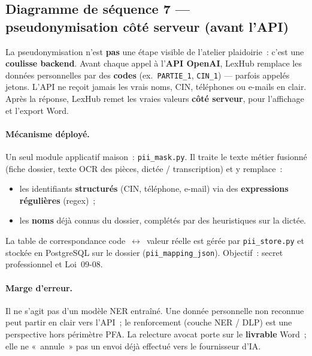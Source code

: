 \subsection{Diagramme de séquence 7 --- pseudonymisation côté serveur (avant l'API)}
\label{sec:seq-pii}

La pseudonymisation n'est \textbf{pas} une étape visible de l'atelier plaidoirie~: c'est une \textbf{coulisse backend}. Avant chaque appel à l'\textbf{API OpenAI}, LexHub remplace les données personnelles par des \textbf{codes} (ex.\ \texttt{PARTIE\_1}, \texttt{CIN\_1}) --- parfois appelés jetons. L'API ne reçoit jamais les vrais noms, CIN, téléphones ou e-mails en clair. Après la réponse, LexHub remet les vraies valeurs \textbf{côté serveur}, pour l'affichage et l'export Word.

\paragraph{Mécanisme déployé.}
Un seul module applicatif maison~: \texttt{pii\_mask.py}. Il traite le texte métier fusionné (fiche dossier, texte OCR des pièces, dictée / transcription) et y remplace~:
\begin{itemize}
  \item les identifiants \textbf{structurés} (CIN, téléphone, e-mail) via des \textbf{expressions régulières} (regex)~;
  \item les \textbf{noms} déjà connus du dossier, complétés par des heuristiques sur la dictée.
\end{itemize}
La table de correspondance code~$\leftrightarrow$~valeur réelle est gérée par \texttt{pii\_store.py} et stockée en PostgreSQL sur le dossier (\texttt{pii\_mapping\_json}). Objectif~: secret professionnel et Loi~09-08.

\paragraph{Marge d'erreur.}
Il ne s'agit pas d'un modèle NER entraîné. Une donnée personnelle non reconnue peut partir en clair vers l'API~; le renforcement (couche NER / DLP) est une perspective hors périmètre PFA. La relecture avocat porte sur le \textbf{livrable} Word~; elle ne «~annule~» pas un envoi déjà effectué vers le fournisseur d'IA.

